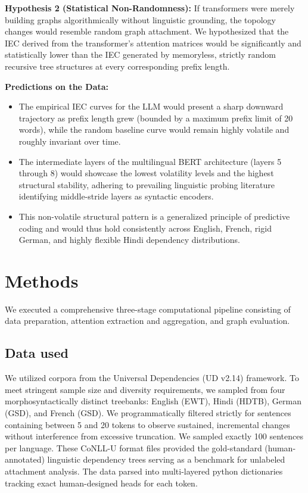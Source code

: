 \documentclass[11pt,a4paper]{article}
\begin{document}
\textbf{Hypothesis 2 (Statistical Non-Randomness):} If transformers were merely building graphs algorithmically without linguistic grounding, the topology changes would resemble random graph attachment. We hypothesized that the IEC derived from the transformer's attention matrices would be significantly and statistically lower than the IEC generated by memoryless, strictly random recursive tree structures at every corresponding prefix length.

\textbf{Predictions on the Data:}
\begin{itemize}
    \item The empirical IEC curves for the LLM would present a sharp downward trajectory as prefix length grew (bounded by a maximum prefix limit of 20 words), while the random baseline curve would remain highly volatile and roughly invariant over time.
    \item The intermediate layers of the multilingual BERT architecture (layers 5 through 8) would showcase the lowest volatility levels and the highest structural stability, adhering to prevailing linguistic probing literature identifying middle-stride layers as syntactic encoders.
    \item This non-volatile structural pattern is a generalized principle of predictive coding and would thus hold consistently across English, French, rigid German, and highly flexible Hindi dependency distributions.
\end{itemize}

\section{Methods}

We executed a comprehensive three-stage computational pipeline consisting of data preparation, attention extraction and aggregation, and graph evaluation.

\subsection{Data used}
We utilized corpora from the Universal Dependencies (UD v2.14) framework. To meet stringent sample size and diversity requirements, we sampled from four morphosyntactically distinct treebanks: English (EWT), Hindi (HDTB), German (GSD), and French (GSD). We programmatically filtered strictly for sentences containing between 5 and 20 tokens to observe sustained, incremental changes without interference from excessive truncation. We sampled exactly 100 sentences per language. These CoNLL-U format files provided the gold-standard (human-annotated) linguistic dependency trees serving as a benchmark for unlabeled attachment analysis. The data parsed into multi-layered python dictionaries tracking exact human-designed heads for each token.
\end{document}
